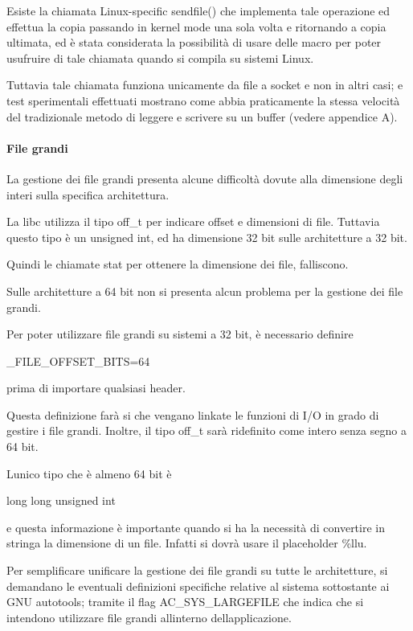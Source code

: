\documentclass[a4paper,11pt]{article}
\begin{document}
{\sffamily
Esiste la chiamata Linux-specific sendfile() che implementa tale
operazione ed effettua la copia passando in kernel mode una sola volta
e ritornando a copia ultimata, ed \`e stata considerata la
possibilit\`a di usare delle macro per poter usufruire di tale chiamata
quando si compila su sistemi Linux.}

{\sffamily
Tuttavia tale chiamata funziona unicamente da file a socket e non in
altri casi; e test sperimentali effettuati mostrano come abbia
praticamente la stessa velocit\`a del tradizionale metodo di leggere e
scrivere su un buffer (vedere appendice A).}


\bigskip

\paragraph{File grandi}
{\sffamily
La gestione dei file grandi presenta alcune difficolt\`a dovute alla
dimensione degli interi sulla specifica architettura.}

{\sffamily
La libc utilizza il tipo off\_t per indicare offset e dimensioni di
file. Tuttavia questo tipo \`e un unsigned int, ed ha dimensione 32 bit
sulle architetture a 32 bit.}

{\sffamily
Quindi le chiamate stat per ottenere la dimensione dei file,
falliscono.}

{\sffamily
Sulle architetture a 64 bit non si presenta alcun problema per la
gestione dei file grandi.}


\bigskip

{\sffamily
Per poter utilizzare file grandi su sistemi a 32 bit, \`e necessario
definire}

{\sffamily
\_FILE\_OFFSET\_BITS=64}

{\sffamily
prima di importare qualsiasi header.}

{\sffamily
Questa definizione far\`a si che vengano linkate le funzioni di I/O in
grado di gestire i file grandi. Inoltre, il tipo off\_t sar\`a
ridefinito come intero senza segno a 64 bit.}

{\sffamily
L{\textquotesingle}unico tipo che \`e almeno 64 bit \`e}

{\ttfamily
long long unsigned int}

{\sffamily
e questa informazione \`e importante quando si ha la necessit\`a di
convertire in stringa la dimensione di un file. Infatti si dovr\`a
usare il placeholder \%llu.}


\bigskip

{\sffamily
Per semplificare unificare la gestione dei file grandi su tutte le
architetture, si demandano le eventuali definizioni specifiche relative
al sistema sottostante ai GNU autotools; tramite il flag
AC\_SYS\_LARGEFILE che indica che si intendono utilizzare file grandi
all{\textquotesingle}interno dell{\textquotesingle}applicazione.}
\end{document}
